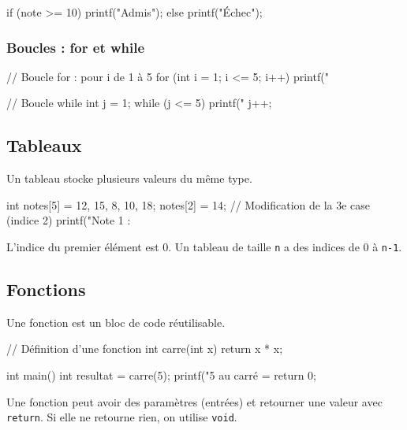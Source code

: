 \begin{ccode}
if (note >= 10) {
    printf("Admis\n");
} else {
    printf("Échec\n");
}
\end{ccode}

\subsubsection{Boucles : for et while}

\begin{ccode}
// Boucle for : pour i de 1 à 5
for (int i = 1; i <= 5; i++) {
    printf("%
}

// Boucle while
int j = 1;
while (j <= 5) {
    printf("%
    j++;
}
\end{ccode}

\subsection{Tableaux}

Un tableau stocke plusieurs valeurs du même type.

\begin{ccode}
int notes[5] = {12, 15, 8, 10, 18};
notes[2] = 14;  // Modification de la 3e case (indice 2)
printf("Note 1 : %
\end{ccode}

\begin{aretenir}
L'indice du premier élément est 0. Un tableau de taille \texttt{n} a des indices de 0 à \texttt{n-1}.
\end{aretenir}

\subsection{Fonctions}

Une fonction est un bloc de code réutilisable.

\begin{ccode}
// Définition d'une fonction
int carre(int x) {
    return x * x;
}

int main() {
    int resultat = carre(5);
    printf("5 au carré = %
    return 0;
}
\end{ccode}

\begin{propriete}
Une fonction peut avoir des paramètres (entrées) et retourner une valeur avec \texttt{return}. Si elle ne retourne rien, on utilise \texttt{void}.
\end{propriete}

